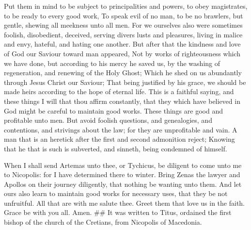  Put them in mind to be subject to principalities and
powers, to obey magistrates, to be ready to every good work,
 To speak evil of no man, to be no brawlers, but gentle,
shewing all meekness unto all men.  For we ourselves also
were sometimes foolish, disobedient, deceived, serving divers lusts and
pleasures, living in malice and envy, hateful, and hating one another.
 But after that the kindness and love of God our Saviour
toward man appeared,  Not by works of righteousness which
we have done, but according to his mercy he saved us, by the washing of
regeneration, and renewing of the Holy Ghost;  Which he
shed on us abundantly through Jesus Christ our Saviour; 
That being justified by his grace, we should be made heirs according to
the hope of eternal life.  This is a faithful saying, and
these things I will that thou affirm constantly, that they which have
believed in God might be careful to maintain good works. These things
are good and profitable unto men.  But avoid foolish
questions, and genealogies, and contentions, and strivings about the
law; for they are unprofitable and vain.  A man that is
an heretick after the first and second admonition reject;
 Knowing that he that is such is subverted, and sinneth,
being condemned of himself.

 When I shall send Artemas unto thee, or Tychicus, be
diligent to come unto me to Nicopolis: for I have determined there to
winter.  Bring Zenas the lawyer and Apollos on their
journey diligently, that nothing be wanting unto them. 
And let ours also learn to maintain good works for necessary uses, that
they be not unfruitful.  All that are with me salute
thee. Greet them that love us in the faith. Grace be with you all. Amen.
\#\# It was written to Titus, ordained the first bishop of the church of
the Cretians, from Nicopolis of Macedonia.
